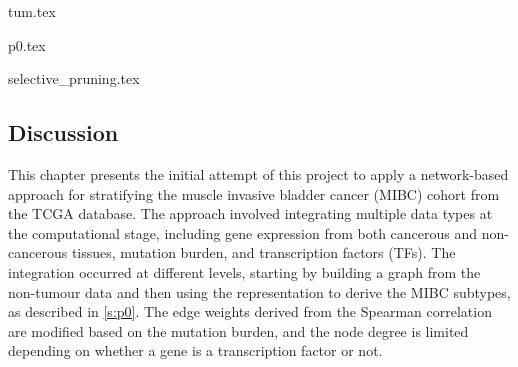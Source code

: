 {tum.tex}



{p0.tex}


{selective_pruning.tex}
\newpage

\subsection{Discussion}

This chapter presents the initial attempt of this project to apply a network-based approach for stratifying the muscle invasive bladder cancer (MIBC) cohort from the TCGA database. The approach involved integrating multiple data types at the computational stage, including gene expression from both cancerous and non-cancerous tissues, mutation burden, and transcription factors (TFs). The integration occurred at different levels, starting by building a graph from the non-tumour data and then using the representation to derive the MIBC subtypes, as described in \cref{s:p0}. The edge weights derived from the Spearman correlation are modified based on the mutation burden, and the node degree is limited depending on whether a gene is a transcription factor or not.

